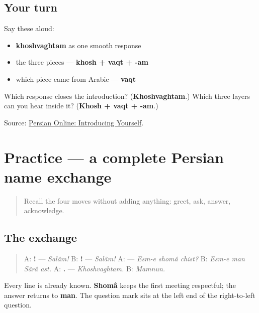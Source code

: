 \subsection*{Your turn}
Say these aloud:

\begin{itemize}
\raggedright
  \item \textbf{khoshvaghtam} as one smooth response
  \item the three pieces — \textbf{khosh + vaqt + -am}
  \item which piece came from Arabic — \textbf{vaqt}
\end{itemize}

\begin{tcolorbox}[breakable,colback=teal!4,colframe=teal!35!black,title={Before you move on}]
Which response closes the introduction? (\textbf{Khoshvaghtam}.) Which three layers can you hear inside it? (\textbf{Khosh + vaqt + -am}.)

Source: \href{https://sites.la.utexas.edu/persian\_online\_resources/vocabulary-lists/people-places-and-things/}{Persian Online: Introducing Yourself}.
\end{tcolorbox}
\section[Practice]{Practice — a complete Persian name exchange}

\label{lesson:FA-C03-practice}



\begin{quote}
Recall the four moves without adding anything: greet, ask, answer, acknowledge.
\end{quote}

\subsection*{The exchange}
\begin{quote}
A: \textbf{!} — \emph{Salâm!} B: \textbf{!} — \emph{Salâm!} A: \textbf{  } — \emph{Esm-e shomâ chist?} B: \emph{Esm-e man Sârâ ast.} A: \textbf{.} — \emph{Khoshvaghtam.} B: \emph{Mamnun.}
\end{quote}

Every line is already known. \textbf{Shomâ} keeps the first meeting respectful; the answer returns to \textbf{man}. The question mark sits at the left end of the right-to-left question.

